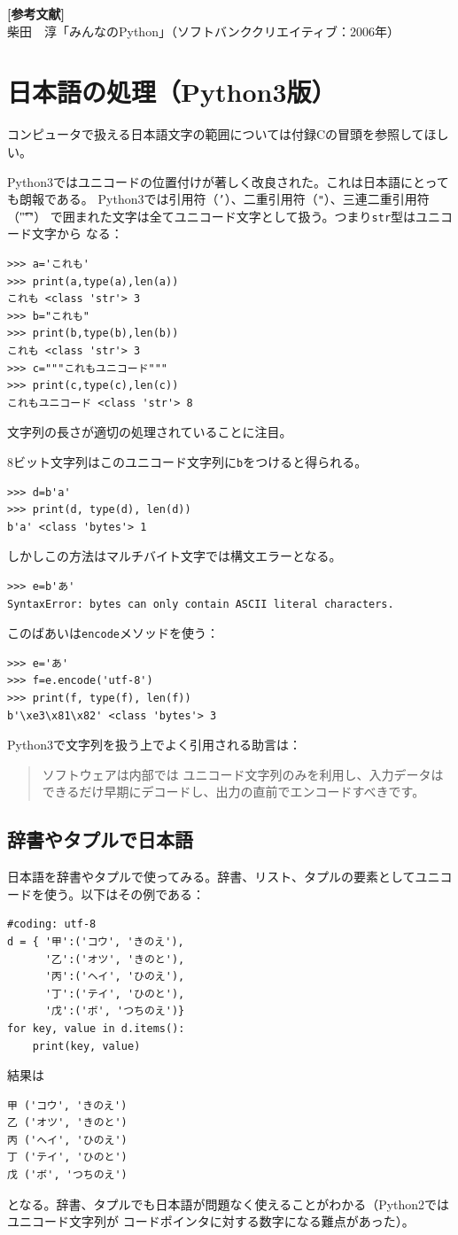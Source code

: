 \documentclass[a4j,12pt,makeidx]{jbook}
\begin{document}
\noindent
{\bf [参考文献]} \\
柴田　淳「みんなのPython」（ソフトバンククリエイティブ：2006年）
%
\chapter{日本語の処理（Python3版）}
コンピュータで扱える日本語文字の範囲については付録Cの冒頭を参照してほしい。\par
Python3ではユニコードの位置付けが著しく改良された。これは日本語にとっても朗報である。
Python3では引用符（{\tt '}）、二重引用符（{\tt "}）、三連二重引用符（{\t """}）
で囲まれた文字は全てユニコード文字として扱う。つまり{\tt str}型はユニコード文字から
なる：
\begin{verbatim}
>>> a='これも'
>>> print(a,type(a),len(a))
これも <class 'str'> 3
>>> b="これも"
>>> print(b,type(b),len(b))
これも <class 'str'> 3
>>> c="""これもユニコード"""
>>> print(c,type(c),len(c))
これもユニコード <class 'str'> 8
\end{verbatim}
文字列の長さが適切の処理されていることに注目。\par
8ビット文字列はこのユニコード文字列に{\tt b}をつけると得られる。
\begin{verbatim}
>>> d=b'a'
>>> print(d, type(d), len(d))
b'a' <class 'bytes'> 1
\end{verbatim}
しかしこの方法はマルチバイト文字では構文エラーとなる。
\begin{verbatim}
>>> e=b'あ'
SyntaxError: bytes can only contain ASCII literal characters.
\end{verbatim}
このばあいは{\tt encode}メソッドを使う：
\begin{verbatim}
>>> e='あ'
>>> f=e.encode('utf-8')
>>> print(f, type(f), len(f))
b'\xe3\x81\x82' <class 'bytes'> 3
\end{verbatim}
Python3で文字列を扱う上でよく引用される助言は：
\begin{quote}
ソフトウェアは内部では ユニコード文字列のみを利用し、入力データはできるだけ早期にデコードし、出力の直前でエンコードすべきです。
\end{quote}
%
\section{辞書やタプルで日本語}
日本語を辞書やタプルで使ってみる。辞書、リスト、タプルの要素としてユニコードを使う。以下はその例である：
\begin{verbatim}
#coding: utf-8
d = { '甲':('コウ', 'きのえ'),
      '乙':('オツ', 'きのと'),
      '丙':('ヘイ', 'ひのえ'),
      '丁':('テイ', 'ひのと'),
      '戊':('ボ', 'つちのえ')}
for key, value in d.items():
    print(key, value)
\end{verbatim}
結果は
\begin{verbatim}
甲 ('コウ', 'きのえ')
乙 ('オツ', 'きのと')
丙 ('ヘイ', 'ひのえ')
丁 ('テイ', 'ひのと')
戊 ('ボ', 'つちのえ')
\end{verbatim}
となる。辞書、タプルでも日本語が問題なく使えることがわかる（Python2ではユニコード文字列が
コードポインタに対する数字になる難点があった）。
%
\end{document}
